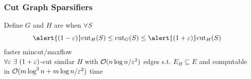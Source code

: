 \documentclass{beamer}
\newcommand{\misoclasstinytitleslide}{Partially based on material by:  Rob Fergus, Nikhil Srivastava,\\[-1em] 
Yiannis Koutis, Joshua Batson, Daniel Spielman}
\begin{document}

\newcommand{\topictitle}{Cut Graph Sparsifiers}

\newcommand{\topicsubtitle}{Benczur-Karger Algorithm}
\renewcommand{\misoclasstinytitleslide}{Partially based on material by:  Rob Fergus, Nikhil Srivastava,\\[-1em] Yiannis Koutis, Joshua Batson, Daniel Spielman}

\MakeTopicSlide

\begin{frame}
\frametitle{Cut Graph Sparsifiers}
Define $G$ and $H$ are   when $\forall S$
\[
\alert{(1-\eps)}\text{cut}_{H}(S)  \leq  \text{cut}_{G}(S) \leq \alert{(1+\eps)}\text{cut}_{H}(S)
\]
\moveb \pause 
{} \pause faster mincut/maxflow
\moveb \pause 
{} \pause 
{}
\\ \smallskip
 $\forall \varepsilon~\exists~ (1+\varepsilon)$-cut similar $H$
with $\mathcal{O}(n \log n/ \varepsilon^2)$  edges s.t. $E_H \subseteq E$
and computable in  $\mathcal{O}(m \log^3 n + m\log n /\varepsilon^2)$ time 
\end{frame}
\end{document}
